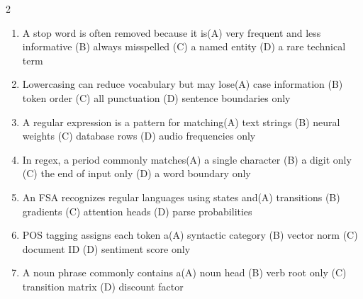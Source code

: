 \documentclass[a4paper]{article}
\begin{document}
\begin{multicols*}{2}
\begin{enumerate}
\item A stop word is often removed because it is\newline\hspace*{0.6em}(A) very frequent and less informative \quad (B) always misspelled \newline\hspace*{0.6em}(C) a named entity \quad (D) a rare technical term
\item Lowercasing can reduce vocabulary but may lose\newline\hspace*{0.6em}(A) case information \quad (B) token order \newline\hspace*{0.6em}(C) all punctuation \quad (D) sentence boundaries only
\item A regular expression is a pattern for matching\newline\hspace*{0.6em}(A) text strings \quad (B) neural weights \newline\hspace*{0.6em}(C) database rows \quad (D) audio frequencies only
\item In regex, a period commonly matches\newline\hspace*{0.6em}(A) a single character \quad (B) a digit only \newline\hspace*{0.6em}(C) the end of input only \quad (D) a word boundary only
\item An FSA recognizes regular languages using states and\newline\hspace*{0.6em}(A) transitions \quad (B) gradients \newline\hspace*{0.6em}(C) attention heads \quad (D) parse probabilities
\item POS tagging assigns each token a\newline\hspace*{0.6em}(A) syntactic category \quad (B) vector norm \newline\hspace*{0.6em}(C) document ID \quad (D) sentiment score only
\item A noun phrase commonly contains a\newline\hspace*{0.6em}(A) noun head \quad (B) verb root only \newline\hspace*{0.6em}(C) transition matrix \quad (D) discount factor

\end{enumerate}
\end{multicols*}
\end{document}
